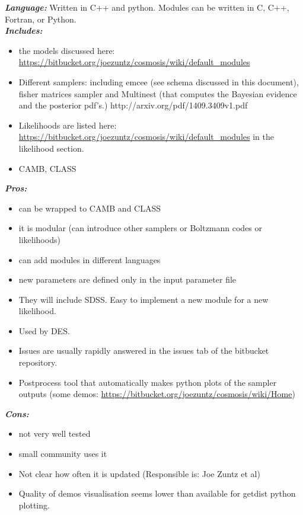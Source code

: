 {\it \bf Language:} Written in C++ and python. Modules can be written in C, C++, Fortran, or Python.\\

{\it \bf Includes: }
\begin{itemize}
\item the models discussed here: \url{https://bitbucket.org/joezuntz/cosmosis/wiki/default_modules}
 \item Different samplers: including emcee (see schema discussed in this document), fisher matrices sampler and Multinest (that computes the Bayesian evidence and the posterior pdf's.) http://arxiv.org/pdf/1409.3409v1.pdf
 \item Likelihoods are listed here: \url{https://bitbucket.org/joezuntz/cosmosis/wiki/default_modules} in the likelihood section.
 \item CAMB, CLASS
\end{itemize}

{\it \bf Pros:} 
\begin{itemize}
 \item can be wrapped to CAMB and CLASS
 \item it is modular (can introduce other samplers or Boltzmann codes or likelihoods) 
 \item can add modules in different languages
 \item new parameters are defined only in the input parameter file
 \item They will include SDSS. Easy to implement a new module for a new likelihood.
 \item Used by DES.
 \item Issues are usually rapidly answered in the issues tab of the bitbucket repository.
 \item Postprocess tool that automatically makes python plots of the sampler outputs (some demos: \url{https://bitbucket.org/joezuntz/cosmosis/wiki/Home})
\end{itemize}

{\it \bf Cons:} 
\begin{itemize}
 \item not very well tested
 \item small community uses it
 \item Not clear how often it is updated (Responsible is: Joe Zuntz et al) 
 \item Quality of demos visualisation seems lower than available for getdist python plotting.
\end{itemize}

